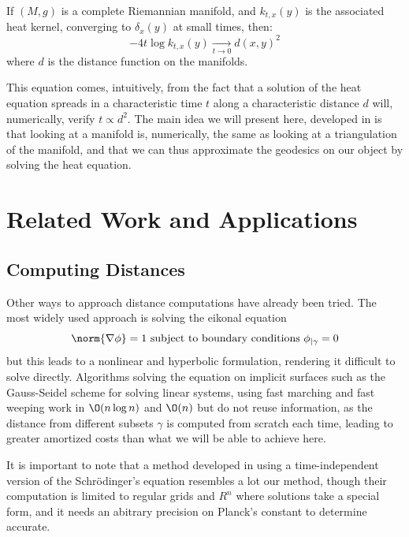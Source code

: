 \documentclass[math, info, english]{cours}
\begin{document}
\begin{thm}
	If $(M, g)$ is a complete Riemannian manifold, and $k_{t, x}(y)$ is the associated heat kernel, converging to $\delta_{x}(y)$ at small times, then:
	\begin{equation}
		\tag{VF}
		-4t \log k_{t, x}(y) \xrightarrow[t \to 0]{} d\left( x, y \right)^{2}
		\label{varadhanformula}
	\end{equation}
	where $d$ is the distance function on the manifolds.
	\label{thm:varadhan}
\end{thm}
This equation comes, intuitively, from the fact that a solution of the heat equation spreads in a characteristic time $t$ along a characteristic distance $d$ will, numerically, verify $t \propto d^{2}$.
The main idea we will present here, developed in \cite{heatgeodesics} is that looking at a manifold is, numerically, the same as looking at a triangulation of the manifold, and that we can thus approximate the geodesics on our object by solving the heat equation.

\section{Related Work and Applications}
\subsection{Computing Distances}
Other ways to approach distance computations have already been tried.
The most widely used approach is solving the eikonal equation
\begin{equation}
	\norm{\nabla \phi} = 1 \text{ subject to boundary conditions } \phi_{\mid \gamma} = 0
\end{equation}
but this leads to a nonlinear and hyperbolic formulation, rendering it difficult to solve directly.
Algorithms solving the equation on implicit surfaces such as the Gauss-Seidel scheme for solving linear systems,
using fast marching and fast weeping work in $\O(n\log n)$ and $\O(n)$ but do not reuse information,
as the distance from different subsets $\gamma$ is computed from scratch each time,
leading to greater amortized costs than what we will be able to achieve here.

It is important to note that a method developed in \cite{schrod} using a time-independent version of the Schrödinger's equation
resembles a lot our method, though their computation is limited to regular grids and $R^{n}$ where solutions take a
special form, and it needs an abitrary precision on Planck's constant to determine accurate.
\end{document}
